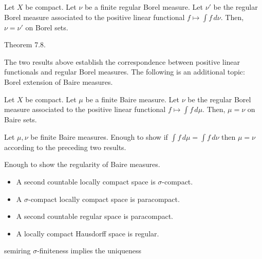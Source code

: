 \documentclass{../note}
\begin{document}
\begin{prb}
Let $X$ be compact.
Let $\nu$ be a finite regular Borel measure.
Let $\nu'$ be the regular Borel measure associated to the positive linear functional $f\mapsto\int f\,d\nu$.
Then, $\nu=\nu'$ on Borel sets.
\end{prb}
\begin{sol}
Theorem 7.8.
\end{sol}

The two results above establish the correspondence between positive linear functionals and regular Borel measures.
The following is an additional topic: Borel extension of Baire measures.
\begin{prb}
Let $X$ be compact.
Let $\mu$ be a finite Baire measure.
Let $\nu$ be the regular Borel measure associated to the positive linear functional $f\mapsto\int f\,d\mu$.
Then, $\mu=\nu$ on Baire sets.
\end{prb}
\begin{sol}
Let $\mu,\nu$ be finite Baire measures.
Enough to show if $\int f\,d\mu=\int f\,d\nu$ then $\mu=\nu$ according to the preceding two results.

Enough to show the regularity of Baire measures.
\end{sol}







\begin{itemize}
\item A second countable locally compact space is $\sigma$-compact.
\item A $\sigma$-compact locally compact space is paracompact.
\item A second countable regular space is paracompact.
\item A locally compact Hausdorff space is regular.
\end{itemize}

semiring
$\sigma$-finiteness implies the uniqueness
\end{document}

